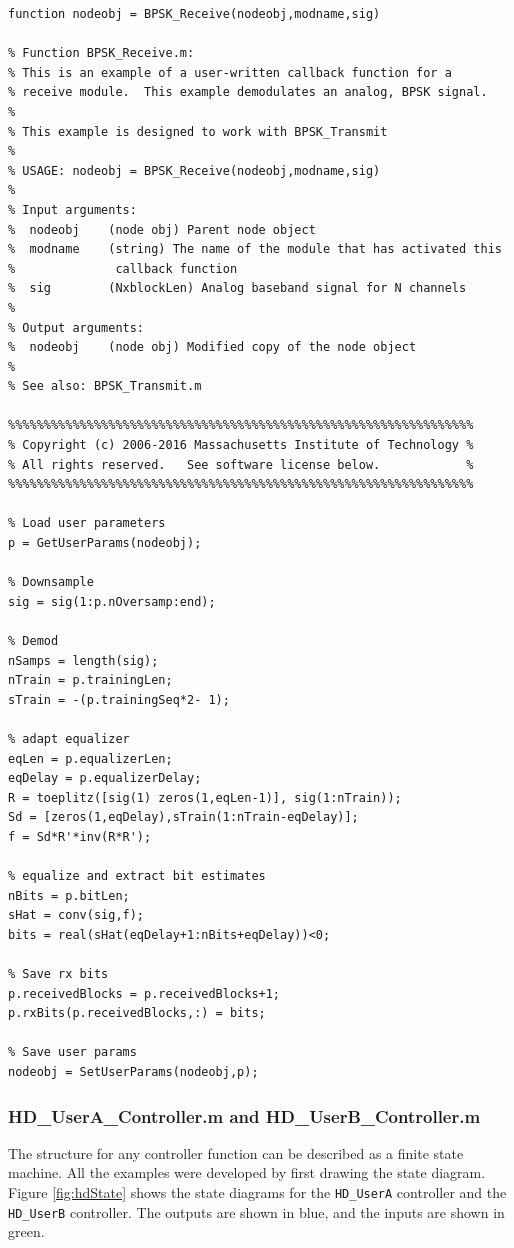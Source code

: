 \begin{lstlisting}[name=bpskRx]
function nodeobj = BPSK_Receive(nodeobj,modname,sig)

% Function BPSK_Receive.m:
% This is an example of a user-written callback function for a 
% receive module.  This example demodulates an analog, BPSK signal.
%
% This example is designed to work with BPSK_Transmit
%
% USAGE: nodeobj = BPSK_Receive(nodeobj,modname,sig)
%
% Input arguments:
%  nodeobj    (node obj) Parent node object
%  modname    (string) The name of the module that has activated this
%              callback function
%  sig        (NxblockLen) Analog baseband signal for N channels
%
% Output arguments:
%  nodeobj    (node obj) Modified copy of the node object
%
% See also: BPSK_Transmit.m

%%%%%%%%%%%%%%%%%%%%%%%%%%%%%%%%%%%%%%%%%%%%%%%%%%%%%%%%%%%%%%%%%
% Copyright (c) 2006-2016 Massachusetts Institute of Technology %
% All rights reserved.   See software license below.            %
%%%%%%%%%%%%%%%%%%%%%%%%%%%%%%%%%%%%%%%%%%%%%%%%%%%%%%%%%%%%%%%%%

% Load user parameters
p = GetUserParams(nodeobj);

% Downsample
sig = sig(1:p.nOversamp:end);

% Demod
nSamps = length(sig);
nTrain = p.trainingLen;
sTrain = -(p.trainingSeq*2- 1);

% adapt equalizer
eqLen = p.equalizerLen;
eqDelay = p.equalizerDelay;
R = toeplitz([sig(1) zeros(1,eqLen-1)], sig(1:nTrain));
Sd = [zeros(1,eqDelay),sTrain(1:nTrain-eqDelay)];
f = Sd*R'*inv(R*R');

% equalize and extract bit estimates 
nBits = p.bitLen;
sHat = conv(sig,f);
bits = real(sHat(eqDelay+1:nBits+eqDelay))<0;

% Save rx bits
p.receivedBlocks = p.receivedBlocks+1;
p.rxBits(p.receivedBlocks,:) = bits;

% Save user params
nodeobj = SetUserParams(nodeobj,p);
\end{lstlisting}

\subsubsection{HD\_UserA\_Controller.m and HD\_UserB\_Controller.m}

The structure for any controller function can be described as a
finite state machine.  All the examples were developed by first
drawing the state diagram.  Figure \ref{fig:hdState} shows the state
diagrams for the \verb+HD_UserA+ controller and the \verb+HD_UserB+
controller. The outputs are shown in blue, and the inputs are shown
in green.

